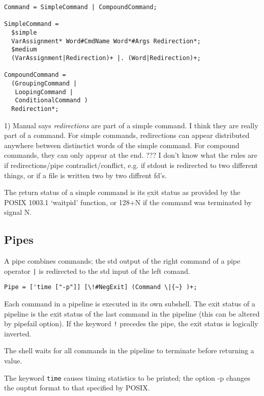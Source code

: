 \documentclass{article}
\begin{document}
\begin{verbatim}
Command = SimpleCommand | CompoundCommand;

SimpleCommand =
  $simple      
  VarAssignment* Word#CmdName Word*#Args Redirection*;
  $medium
  (VarAssignment|Redirection)+ |. (Word|Redirection)+;      
        
CompoundCommand = 	
  (GroupingCommand |
   LoopingCommand |        
   ConditionalCommand )
  Redirection*; 
\end{verbatim}

1) Manual says \emph{redirections} are part of a simple command. I think
they are really part of a command. For simple commands, redirections can
appear distributed anywhere between distinctict words of the simple
command. For compound commands, they can only appear at the end. ??? I
don't know what the rules are if redirections/pipe contradict/conflict,
e.g. if stdout is redirected to two different things, or if a file is
written two by two diffrent fd's.

The \b{return status} of a simple command is its \b{exit status} as
provided by the POSIX 1003.1 `waitpid' function, or 128+N if the command
was terminated by signal N.


\subsection{Pipes}

A pipe combines commands; the std output of the right command of a pipe
operator \verb#|# is redirected to the std input of the left comand.

\begin{verbatim}
Pipe = ['time ["-p"]] [\!#NegExit] (Command \|{~} )+;  
\end{verbatim}

Each command in a pipeline is executed in its own subshell. The exit
status of a pipeline is the exit status of the last command in the
pipeline (this can be altered by pipefail option). If the keyword
\verb|!| precedes the pipe, the exit status is logically inverted.

The shell waits for all commands in the pipeline to terminate before
returning a value.

The keyword \verb|time| causes timing statistics to be printed; the option -p
changes the ouptut format to that specified by POSIX.

\end{document}

